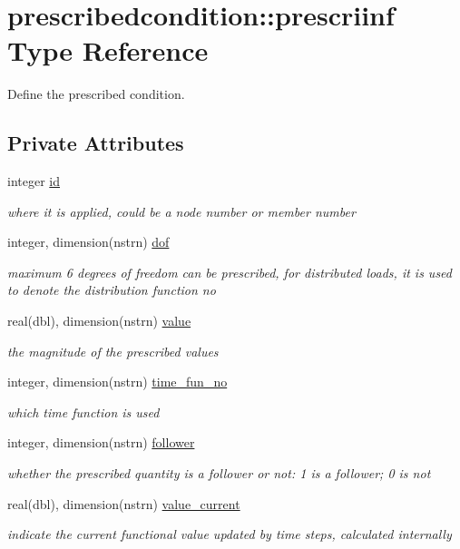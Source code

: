 \hypertarget{structprescribedcondition_1_1prescriinf}{}\section{prescribedcondition\+:\+:prescriinf Type Reference}
\label{structprescribedcondition_1_1prescriinf}


Define the prescribed condition.  


\subsection*{Private Attributes}
\begin{DoxyCompactItemize}
\item 
integer \hyperlink{structprescribedcondition_1_1prescriinf_ad7a7ffe265b06ff7c2a1487bb0b9cf56}{id}
\begin{DoxyCompactList}\small\item\em where it is applied, could be a node number or member number \end{DoxyCompactList}\item 
integer, dimension(nstrn) \hyperlink{structprescribedcondition_1_1prescriinf_add1a1e3ab7bef3eaf011f074368c89f8}{dof}
\begin{DoxyCompactList}\small\item\em maximum 6 degrees of freedom can be prescribed, for distributed loads, it is used to denote the distribution function no \end{DoxyCompactList}\item 
real(dbl), dimension(nstrn) \hyperlink{structprescribedcondition_1_1prescriinf_a42fcd5b12e0a171e60ddf14041ab09aa}{value}
\begin{DoxyCompactList}\small\item\em the magnitude of the prescribed values \end{DoxyCompactList}\item 
integer, dimension(nstrn) \hyperlink{structprescribedcondition_1_1prescriinf_afebb4f4446a4d4877901b4d777af811a}{time\+\_\+fun\+\_\+no}
\begin{DoxyCompactList}\small\item\em which time function is used \end{DoxyCompactList}\item 
integer, dimension(nstrn) \hyperlink{structprescribedcondition_1_1prescriinf_a7e97cae9888b22f4229b56b3a0d2e3b1}{follower}
\begin{DoxyCompactList}\small\item\em whether the prescribed quantity is a follower or not\+: 1 is a follower; 0 is not \end{DoxyCompactList}\item 
real(dbl), dimension(nstrn) \hyperlink{structprescribedcondition_1_1prescriinf_adb8c3bfd5669cc2eccb447f24556ebaf}{value\+\_\+current}
\begin{DoxyCompactList}\small\item\em indicate the current functional value updated by time steps, calculated internally \end{DoxyCompactList}\end{DoxyCompactItemize}


